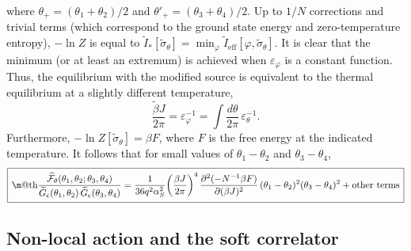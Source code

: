 \documentclass[12pt]{article}
\makeatletter
\newcommand*{\wideboxed}[1]{\setlength{\fboxsep}{1ex}%
  \fbox{\m@th$\displaystyle#1$}}
\newcommand{\calF}{\mathcal{F}}
\newcommand{\cc}{\mathrm{c}}
\newcommand{\eff}{\text{eff}}
\newcommand{\tI}{\tilde{I}}
\newcommand{\tG}{\widetilde{G}}
\newcommand{\tF}{\widetilde{\calF}}
\newcommand{\tsig}{\tilde{\sigma}}
\newcommand{\vep}{\varepsilon}
\newcommand{\vp}{\varphi}
\makeatother
\begin{document}
where $\theta_{+}=(\theta_1+\theta_2)/2$ and $\theta'_{+}=(\theta_3+\theta_4)/2$. Up to $1/N$ corrections and trivial terms (which correspond to the ground state energy and zero-temperature entropy), $-\ln Z$ is equal to $\tI_{*}[\tsig_{\theta}]=\min_{\vp}\tI_{\eff}[\vp,\tsig_{\theta}]$. It is clear that the minimum (or at least an extremum) is achieved when $\vep_{\vp}$ is a constant function. Thus, the equilibrium with the modified source is equivalent to the thermal equilibrium at a slightly different temperature,
\begin{equation}
\frac{\widetilde{\beta}J}{2\pi}=\vep_{\vp}^{-1}
=\int\frac{d\theta}{2\pi}\,\vep_{\theta}^{-1}.
\end{equation}
Furthermore, $-\ln Z[\tsig_{\theta}]=\beta F$, where $F$ is the free energy at the indicated temperature. It follows that for small values of $\theta_1-\theta_2$ and $\theta_3-\theta_4$,
\begin{equation}\label{4p-thermo}
\wideboxed{
\frac{\tF_{\theta}(\theta_1,\theta_2;\theta_3,\theta_4)}
{\tG_{\cc}(\theta_1,\theta_2)\,\tG_{\cc}(\theta_3,\theta_4)}
=\frac{1}{36q^2\alpha_S^2}\biggl(\frac{\beta J}{2\pi}\biggr)^4\,
\frac{\partial^2(-N^{-1}\beta F)}{\partial(\beta J)^2}\,
(\theta_1-\theta_2)^2(\theta_3-\theta_4)^2
+\text{other terms}
}
\end{equation}


\subsection{Non-local action and the soft correlator}\label{sec_nonlocal}
\end{document}
